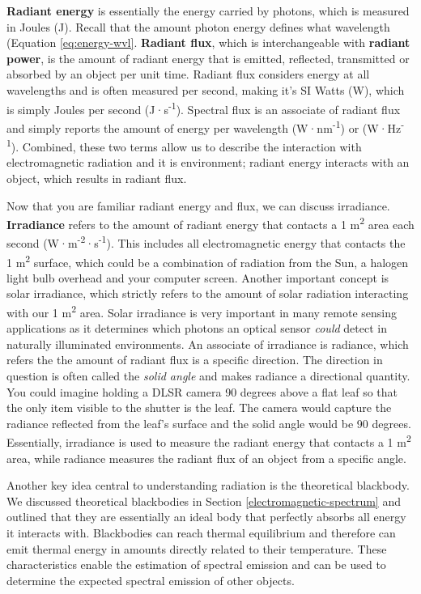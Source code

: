 \documentclass[
]{book}
\begin{document}
\textbf{Radiant energy} is essentially the energy carried by photons, which is measured in Joules (J). Recall that the amount photon energy defines what wavelength (Equation \eqref{eq:energy-wvl}. \textbf{Radiant flux}, which is interchangeable with \textbf{radiant power}, is the amount of radiant energy that is emitted, reflected, transmitted or absorbed by an object per unit time. Radiant flux considers energy at all wavelengths and is often measured per second, making it's SI Watts (W), which is simply Joules per second (J·s\textsuperscript{-1}). Spectral flux is an associate of radiant flux and simply reports the amount of energy per wavelength (W·nm\textsuperscript{-1}) or (W·Hz\textsuperscript{-1}). Combined, these two terms allow us to describe the interaction with electromagnetic radiation and it is environment; radiant energy interacts with an object, which results in radiant flux.

Now that you are familiar radiant energy and flux, we can discuss irradiance. \textbf{Irradiance} refers to the amount of radiant energy that contacts a 1 m\textsuperscript{2} area each second (W·m\textsuperscript{-2}·s\textsuperscript{-1}). This includes all electromagnetic energy that contacts the 1 m\textsuperscript{2} surface, which could be a combination of radiation from the Sun, a halogen light bulb overhead and your computer screen. Another important concept is solar irradiance, which strictly refers to the amount of solar radiation interacting with our 1 m\textsuperscript{2} area. Solar irradiance is very important in many remote sensing applications as it determines which photons an optical sensor \emph{could} detect in naturally illuminated environments. An associate of irradiance is radiance, which refers the the amount of radiant flux is a specific direction. The direction in question is often called the \emph{solid angle} and makes radiance a directional quantity. You could imagine holding a DLSR camera 90 degrees above a flat leaf so that the only item visible to the shutter is the leaf. The camera would capture the radiance reflected from the leaf's surface and the solid angle would be 90 degrees. Essentially, irradiance is used to measure the radiant energy that contacts a 1 m\textsuperscript{2} area, while radiance measures the radiant flux of an object from a specific angle.

Another key idea central to understanding radiation is the theoretical blackbody. We discussed theoretical blackbodies in Section \ref{electromagnetic-spectrum} and outlined that they are essentially an ideal body that perfectly absorbs all energy it interacts with. Blackbodies can reach thermal equilibrium and therefore can emit thermal energy in amounts directly related to their temperature. These characteristics enable the estimation of spectral emission and can be used to determine the expected spectral emission of other objects.
\end{document}
